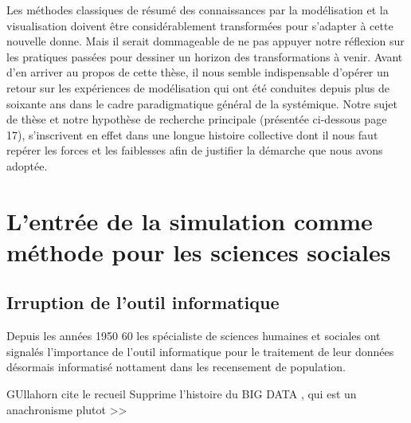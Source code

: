 Les méthodes classiques de résumé des connaissances par la modélisation et la visualisation doivent être considérablement transformées pour s’adapter à cette nouvelle donne. Mais il serait dommageable de ne pas appuyer notre réflexion sur les pratiques passées pour dessiner un horizon des transformations à venir. Avant d’en arriver au propos de cette thèse, il nous semble indispensable d’opérer un retour sur les expériences de modélisation qui ont été conduites depuis plus de soixante ans dans le cadre paradigmatique général de la systémique. Notre sujet de thèse et notre hypothèse de recherche principale (présentée ci-dessous page 17), s’inscrivent en effet dans une longue histoire collective dont il nous faut repérer les forces et les faiblesses afin de justifier la démarche que nous avons adoptée. 

\section{L'entrée de la simulation comme méthode pour les sciences sociales}

\subsection{Irruption de l'outil informatique }
\label{sec:apparition_outil_informatique}

Depuis les années 1950 60 les spécialiste de sciences humaines et sociales ont signalés l'importance de l'outil informatique pour le traitement de leur données désormais informatisé nottament dans les recensement de population.

GUllahorn cite le recueil 
Supprime l'histoire du BIG DATA , qui est un anachronisme plutot >> 

